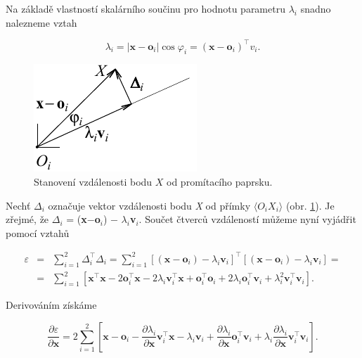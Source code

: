 Na základě vlastností skalárního součinu pro hodnotu parametru $\lambda_{i}$ snadno nalezneme vztah

\begin{equation} \label{eq:11_23}
    \lambda_{i} = \left|\mathbf{x} - \mathbf{o}_{i} \right| \cos \varphi_{i} = \left(\mathbf{x} - \mathbf{o}_{i} \right)^\top v_{i} .
\end{equation}

\begin{figure}[th]
    \begin{center}
        \includegraphics[scale=.9]{11_stereo/images/img_11_5.pdf}
    \end{center}
    \caption{Stanovení vzdálenosti bodu $X$ od promítacího paprsku.}
    \label{img:11_5}
\end{figure}

Nechť \textbf{$\Delta$}$_{i}$ označuje vektor vzdálenosti bodu \textit{X} od přímky $\langle O_i X_i\rangle$ (obr. \ref{img:11_5}). Je zřejmé, že \textbf{$\Delta$}$_{i}$ = (\textbf{x}$-$\textbf{o}$_{i}$) $-$ $\lambda_{i}$\textbf{v}$_{i}$. Součet čtverců vzdáleností můžeme nyní vyjádřit pomocí vztahů

\begin{eqnarray} \label{eq:11_24}
    \varepsilon &=& \sum_{i=1}^{2} \Delta_{i}^\top \Delta_{i} = \sum_{i=1}^{2} \left[ \left(\mathbf{x} - \mathbf{o}_{i} \right) - \lambda_{i} \mathbf{v}_{i} \right]^\top \left[ \left(\mathbf{x} - \mathbf{o}_{i} \right) - \lambda_{i} \mathbf{v}_{i} \right] = \nonumber \\ 
    &=& \sum_{i=1}^{2} \left[ \mathbf{x}^\top \mathbf{x} - 2 \mathbf{o}_{i}^\top \mathbf{x} - 2 \lambda_{i} \mathbf{v}_{i}^\top \mathbf{x} + \mathbf{o}_{i}^\top \mathbf{o}_{i} + 2 \lambda_{i} \mathbf{o}_{i}^\top \mathbf{v}_{i} + \lambda_{i}^{2} \mathbf{v}_{i}^\top \mathbf{v}_{i} \right] .
\end{eqnarray}

Derivováním získáme

\begin{equation} \label{eq:11_25}
    \frac{\partial \varepsilon}{\partial \mathbf{x}} = 2 \sum_{i=1}^{2} \left[ \mathbf{x} - \mathbf{o}_{i} - \frac{\partial \lambda_{i}}{\partial \mathbf{x}} \mathbf{v}_{i}^\top \mathbf{x} - \lambda_{i} \mathbf{v}_{i} + \frac{\partial \lambda_{i}}{\partial \mathbf{x}} \mathbf{o}_{i}^\top \mathbf{v}_{i} + \lambda_{i} \frac{\partial \lambda_{i}}{\partial \mathbf{x}} \mathbf{v}_{i}^\top \mathbf{v}_{i} \right] .
\end{equation}

